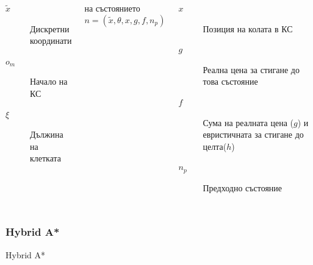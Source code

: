 \documentclass[hyperref=unicode]{beamer}
\begin{document}
\begin{frame}
\begin{columns}
      \begin{flushleft}
      \tiny\begin{description}
          \item[$\widetilde{x}$]{Дискретни координати}
          \item[$o_m$]{Начало на КС}
          \item[$\xi$]{Дължина на клетката}
        \end{description}
      \end{flushleft}
      \tiny\begin{alertblock}{ на състоянието}
        \begin{equation*}
          n = \left(\widetilde{x},\theta,x,g,f,n_p\right)
        \end{equation*}
      \end{alertblock}
      \begin{description}
        \item[$x$]{Позиция на колата в КС}
        \item[$g$]{Реална цена за стигане до това състояние}
        \item[$f$]{Сума на реалната цена ($g$) и евристичната за стигане до целта($h$)}
        \item[$n_p$]{Предходно състояние}
      \end{description}
      \end{columns}
    \end{frame}
    \begin{frame}
      \frametitle{Hybrid A*}
      \tiny\begin{algorithm}[H]
        \caption{Hybrid A*}\label{has}
        \begin{algorithmic}
              \EndIf
            \EndWhile
          \EndProcedure
        \end{algorithmic}
      \end{algorithm}
    \end{frame}
\end{document}
